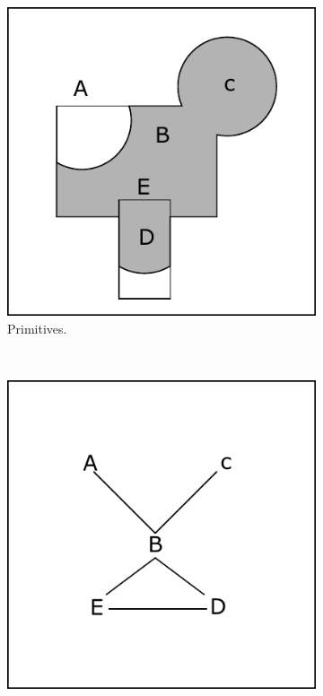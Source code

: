 \begin{figure}[htb]
	\centering
	\begin{subfigure}[b]{0.3\linewidth}
		\includegraphics[width=\textwidth]{figures/pipe_0.pdf}
		\caption{Primitives.}
		\label{fig:pipe0}
	\end{subfigure}
	~
	\begin{subfigure}[b]{0.3\linewidth}
		\includegraphics[width=\textwidth]{figures/pipe_1.pdf}

\end{subfigure}
\end{figure}
